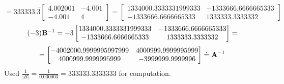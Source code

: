             \[
            =
            333333.\bar{3}
            \begin{bmatrix}
                4.002001 & -4.001 \\
                -4.001 & 4
            \end{bmatrix}
            =
            \begin{bmatrix}
                1334000.3333331999333 & -1333666.6666665333 \\
                -1333666.6666665333 & 1333333.3333332
            \end{bmatrix}
        \]
        \[
            (-3) \bold{B}^{-1}
            =
            -3
            \begin{bmatrix}
                1334000.3333331999333 & -1333666.6666665333 \\
                -1333666.6666665333 & 1333333.3333332
            \end{bmatrix}
            =
        \]
        \[
            =
            \begin{bmatrix}
                -4002000.9999995997999 & 4000999.9999995999 \\
                4000999.9999995999 & -3999999.9999996
            \end{bmatrix}
            \doteq
            \bold{A}^{-1}
        \]
        Used $\frac{1}{\left|B\right|}=\frac{1}{0.000003}=333333.3333333$ for computation.